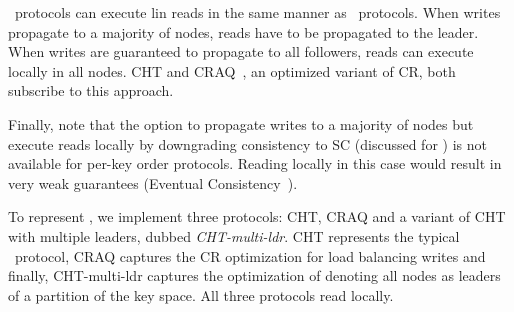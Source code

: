 \LPKO~protocols can execute lin reads in the same manner as \LTO~protocols. %
When writes propagate to a majority of nodes, reads have to be propagated to the leader. When writes are guaranteed to propagate to all followers, reads can execute locally in all nodes. CHT and CRAQ~\cite{Terrace:2009}, an optimized variant of CR, both subscribe to this approach.

Finally, note that the option to propagate writes to a majority of nodes but execute reads locally by  downgrading consistency to SC (discussed for \LTO) is not available for per-key order protocols. Reading locally in this case would result in very weak guarantees (\ie Eventual Consistency~\cite{Vogels:2009}).

To represent \LPKO, we implement three protocols: CHT, CRAQ and a variant of CHT with multiple leaders, dubbed \emph{CHT-multi-ldr}. 
CHT represents the typical \LPKO~protocol, 
CRAQ captures the CR optimization for load balancing writes and %
finally, CHT-multi-ldr captures the optimization of denoting all nodes as leaders of a partition of the key space.
All three protocols read locally.



